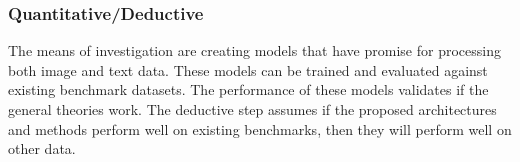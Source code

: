 \subsubsection{Quantitative/Deductive}


The means of investigation are creating models that have promise for processing both image and text data.  These models can be trained and evaluated against existing benchmark datasets.  The performance of these models validates if the general theories work.  The deductive step assumes if the proposed architectures and methods perform well on existing benchmarks, then they will perform well on other data.  

